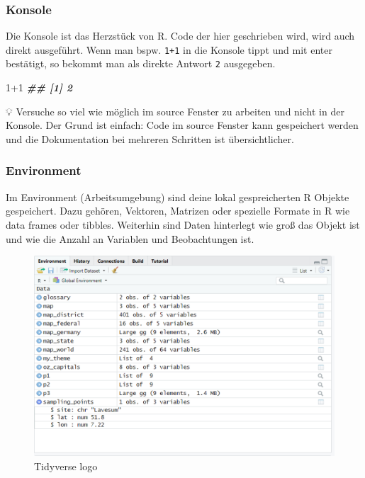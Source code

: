 \documentclass[
]{article}
\newenvironment{Shaded}{\begin{snugshade}}{\end{snugshade}}
\newcommand{\DecValTok}[1]{\textcolor[rgb]{0.00,0.00,0.81}{#1}}
\newcommand{\DocumentationTok}[1]{\textcolor[rgb]{0.56,0.35,0.01}{\textbf{\textit{#1}}}}
\newcommand{\SpecialCharTok}[1]{\textcolor[rgb]{0.00,0.00,0.00}{#1}}
\begin{document}
\hypertarget{konsole}{%
\subsubsection{Konsole}\label{konsole}}

Die Konsole ist das Herzstück von R. Code der hier geschrieben wird, wird auch direkt ausgeführt. Wenn man bspw. \texttt{1+1} in die Konsole tippt und mit enter bestätigt, so bekommt man als direkte Antwort \texttt{2} ausgegeben.

\begin{Shaded}
\begin{Highlighting}[]
\DecValTok{1}\SpecialCharTok{+}\DecValTok{1}
\DocumentationTok{\#\# [1] 2}
\end{Highlighting}
\end{Shaded}

💡 Versuche so viel wie möglich im source Fenster zu arbeiten und nicht in der Konsole. Der Grund ist einfach: Code im source Fenster kann gespeichert werden und die Dokumentation bei mehreren Schritten ist übersichtlicher.

\hypertarget{environment}{%
\subsubsection{Environment}\label{environment}}

Im Environment (Arbeitsumgebung) sind deine lokal gespreicherten R Objekte gespeichert. Dazu gehören, Vektoren, Matrizen oder spezielle Formate in R wie data frames oder tibbles. Weiterhin sind Daten hinterlegt wie groß das Objekt ist und wie die Anzahl an Variablen und Beobachtungen ist.

\begin{figure}

{\centering \includegraphics[width=1\linewidth]{images/008} 

}

\caption{Tidyverse logo}\label{fig:unnamed-chunk-15}
\end{figure}
\end{document}
